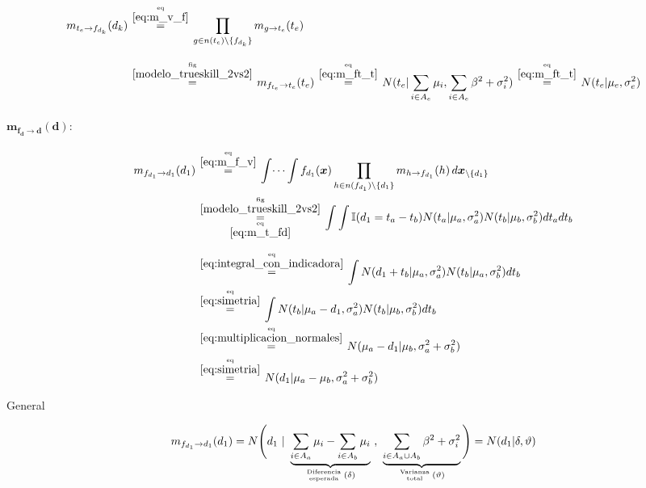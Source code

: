 \documentclass[article]{jss}
\newcommand\hfrac[2]{\genfrac{}{}{0pt}{}{#1}{#2}} %
\begin{document}
\begin{appendix}
\begin{equation}\label{eq:m_t_fd}
\begin{split}
m_{t_e \rightarrow f_{d_{k}}}(d_{k}) & \overset{\hfrac{\text{eq}}{\ref{eq:m_v_f}}}{=} \prod_{g \in n(t_e) \setminus  \{f_{d_{k}} \}} m_{g \rightarrow t_e} (t_e) \\[0.3cm]
 & \overset{\hfrac{\text{fig}}{\ref{modelo_trueskill_2vs2}}}{=} m_{f_{t_e} \rightarrow t_e}(t_e) \overset{\hfrac{\text{eq}}{\ref{eq:m_ft_t}}}{=} N(t_e| \sum_{i \in A_e} \mu_i, \sum_{i \in A_e} \beta^2 + \sigma_i^2) \overset{\hfrac{\text{eq}}{\ref{eq:m_ft_t}}}{=} N(t_e|\mu_e,\sigma_e^2)
\end{split}
\end{equation}

\paragraph{$\bm{m_{f_d \rightarrow d}(d)}:$}

\begin{equation}
 \begin{split}
  m_{f_{d_1} \rightarrow d_1}(d_1) & \overset{\hfrac{\text{eq}}{\ref{eq:m_f_v}}}{=} \int \dots \int f_{d_1}(\bm{x}) \prod_{h \in n(f_{d_1}) \setminus \{d_1\} } m_{h \rightarrow f_{d_1}}(h) \, d\bm{x}_{\setminus \{d_1\} }  \\
  & \overset{\hfrac{\text{fig}}{\ref{modelo_trueskill_2vs2}}}{\underset{\hfrac{\text{eq}}{\ref{eq:m_t_fd}}}{=}} \int \int \mathbb{I}(d_1 = t_a - t_b) N(t_a| \mu_a, \sigma_a^2)  N(t_b| \mu_b, \sigma_b^2)  dt_adt_b \\[0.25cm]
  & \overset{\hfrac{\text{eq}}{\ref{eq:integral_con_indicadora}}}{=} \int N(d_1 + t_b| \mu_a, \sigma_a^2)  N(t_b| \mu_a, \sigma_b^2)  dt_b \\
  & \overset{\hfrac{\text{eq}}{\ref{eq:simetria}}}{=} \int N(t_b| \mu_a - d_1 , \sigma_a^2)  N(t_b| \mu_b, \sigma_b^2)  dt_b \\
  & \overset{\hfrac{\text{eq}}{\ref{eq:multiplicacion_normales}}}{=} N( \mu_a - d_1 | \mu_b, \sigma_a^2 +\sigma_b^2  ) \\
  & \overset{\hfrac{\text{eq}}{\ref{eq:simetria}}}{=} N( d_1 | \mu_a - \mu_b, \sigma_a^2 +\sigma_b^2  )
 \end{split}
\end{equation}

General

\begin{equation} \label{eq:m_fd_d}
 m_{f_{d_1} \rightarrow d_1}(d_1) = N\Bigg(d_1 \ | \ \underbrace{\sum_{i \in A_a} \mu_i - \sum_{i \in A_b} \mu_i}_{\hfrac{\text{Diferencia}}{\text{esperada}} \, (\delta)} \ , \  \underbrace{\sum_{i \in A_a \cup A_b} \beta^2 + \sigma_i^2}_{\hfrac{\text{Varianza}}{\text{total}} \, (\vartheta) } \Bigg) = N(d_1 | \delta, \vartheta)
\end{equation}


\end{appendix}
\end{document}
